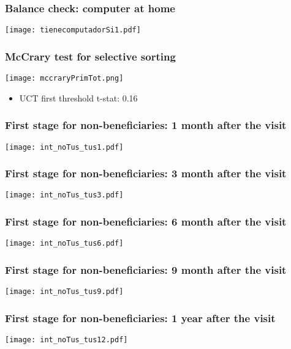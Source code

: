 \documentclass{beamer}
\begin{document}
\begin{frame}
\frametitle{Balance check: computer at home}
\begin{center}
	\texttt{[image: tienecomputadorSi1.pdf]} 
	\label{tienecomputadorSi1}
\end{center}
\end{frame}

\begin{frame}
\frametitle{McCrary test for selective sorting}
\begin{center}
	\texttt{[image: mccraryPrimTot.png]} 
	\label{mccrary}
\end{center}
\begin{itemize}
	\item UCT first threshold t-stat: 0.16
\end{itemize}
\end{frame}

\begin{frame}
\frametitle{First stage for non-beneficiaries: 1 month after the visit}
\begin{center}
	\texttt{[image: int\_noTus\_tus1.pdf]}
	\label{int_noTus_tus1}
\end{center}
\end{frame}

\begin{frame}
\frametitle{First stage for non-beneficiaries: 3 month after the visit}
\begin{center}
\texttt{[image: int\_noTus\_tus3.pdf]}
\label{int_noTus_tus3}
\end{center}
\end{frame}

\begin{frame}
\frametitle{First stage for non-beneficiaries: 6 month after the visit}
\begin{center}
\texttt{[image: int\_noTus\_tus6.pdf]}
\label{int_noTus_tus6}
\end{center}
\end{frame}

\begin{frame}
\frametitle{First stage for non-beneficiaries: 9 month after the visit}
\begin{center}
\texttt{[image: int\_noTus\_tus9.pdf]}
\label{int_noTus_tus9}
\end{center}
\end{frame}

\begin{frame}
\frametitle{First stage for non-beneficiaries: 1 year after the visit}
\begin{center}
	\texttt{[image: int\_noTus\_tus12.pdf]}
	\label{int_noTus_tus12}
\end{center}
\end{frame}
\end{document}
